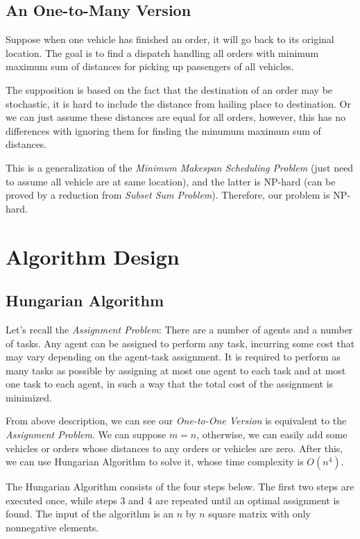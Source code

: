 \documentclass{llncs}
\begin{document}
\subsection{An One-to-Many Version}
Suppose when one vehicle has finished an order, it will go back to its original location. The goal is to find a dispatch handling all orders with minimum maximum sum of distances for picking up passengers of all vehicles.

The supposition is based on the fact that the destination of an order may be stochastic, it is hard to include the distance from hailing place to destination. Or we can just assume these distances are equal for all orders, however, this has no differences with ignoring them for finding the minumum maximum sum of distances.

This is a generalization of the \textit{Minimum Makespan Scheduling Problem} (just need to assume all vehicle are at same location), and the latter is NP-hard (can be proved by a reduction from \textit{Subset Sum Problem}). Therefore, our problem is NP-hard.

\section{Algorithm Design}

\subsection{Hungarian Algorithm}
Let's recall the \textit{Assignment Problem}\cite{assignment_problem_wiki}: There are a number of agents and a number of tasks. Any agent can be assigned to perform any task, incurring some cost that may vary depending on the agent-task assignment. It is required to perform as many tasks as possible by assigning at most one agent to each task and at most one task to each agent, in such a way that the total cost of the assignment is minimized.

From above description, we can see our \textit{One-to-One Version} is equivalent to the \textit{Assignment Problem}. We can suppose $m=n$, otherwise, we can easily add some vehicles or orders whose distances to any orders or vehicles are zero. After this, we can use Hungarian Algorithm\cite{hungarian_algorithm_wiki,hungarian_algorithm} to solve it, whose time complexity is $O(n^4)$.

The Hungarian Algorithm consists of the four steps below. The first two steps are executed once, while steps 3 and 4 are repeated until an optimal assignment is found. The input of the algorithm is an $n$ by $n$ square matrix with only nonnegative elements.
\end{document}
